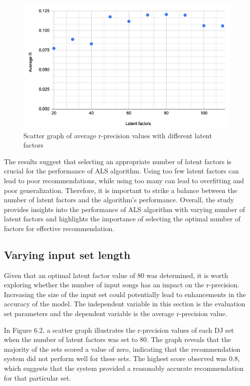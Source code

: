 \begin{figure}[H]
	\includegraphics[scale=0.6]{images/average_r_over_latent}
	\centering
	\caption{Scatter graph of average r-precision values with different latent factors} 
\end{figure}

The results suggest that selecting an appropriate number of latent factors is crucial for the performance of ALS algorithm. Using too few latent factors can lead to poor recommendations, while using too many can lead to overfitting and poor generalization. Therefore, it is important to strike a balance between the number of latent factors and the algorithm's performance. Overall, the study provides insights into the performance of ALS algorithm with varying number of latent factors and highlights the importance of selecting the optimal number of factors for effective recommendation.

\subsection{Varying input set length}
Given that an optimal latent factor value of 80 was determined, it is worth exploring whether the number of input songs has an impact on the r-precision. Increasing the size of the input set could potentially lead to enhancements in the accuracy of the model. The independent variable in this section is the evaluation set parameters and the dependent variable is the average r-precision value.

In Figure 6.2, a scatter graph illustrates the r-precision values of each DJ set when the number of latent factors was set to 80. The graph reveals that the majority of the sets scored a value of zero, indicating that the recommendation system did not perform well for these sets. The highest score observed was 0.8, which suggests that the system provided a reasonably accurate recommendation for that particular set.

